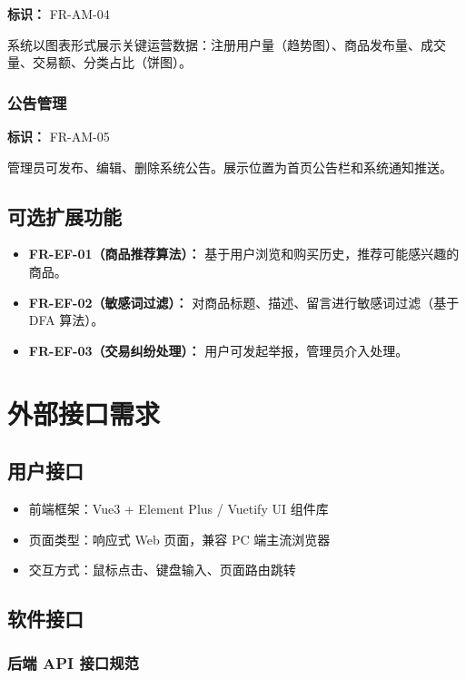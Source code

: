 \documentclass[12pt,a4paper,UTF8]{ctexart}
\begin{document}
\textbf{标识：} FR-AM-04

系统以图表形式展示关键运营数据：注册用户量（趋势图）、商品发布量、成交量、交易额、分类占比（饼图）。

\subsubsection{公告管理}

\textbf{标识：} FR-AM-05

管理员可发布、编辑、删除系统公告。展示位置为首页公告栏和系统通知推送。

\subsection{可选扩展功能}

\begin{itemize}[itemsep=5pt]
    \item \textbf{FR-EF-01（商品推荐算法）：} 基于用户浏览和购买历史，推荐可能感兴趣的商品。
    \item \textbf{FR-EF-02（敏感词过滤）：} 对商品标题、描述、留言进行敏感词过滤（基于 DFA 算法）。
    \item \textbf{FR-EF-03（交易纠纷处理）：} 用户可发起举报，管理员介入处理。
\end{itemize}

\section{外部接口需求}

\subsection{用户接口}

\begin{itemize}[itemsep=3pt]
    \item 前端框架：Vue3 + Element Plus / Vuetify UI 组件库
    \item 页面类型：响应式 Web 页面，兼容 PC 端主流浏览器
    \item 交互方式：鼠标点击、键盘输入、页面路由跳转
\end{itemize}

\subsection{软件接口}

\subsubsection{后端 API 接口规范}
\end{document}
